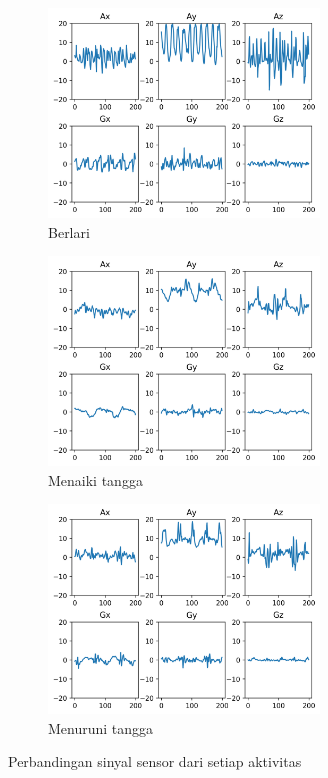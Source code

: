 \begin{figure}[h!]
\begin{subfigure}{0.5\textwidth}
        \includegraphics[width=7.2cm]{data/plot-sensor/berlari.png}
        \caption{Berlari}
        \label{gambar:plot-sensor-berlari}
    \end{subfigure}
    \begin{subfigure}{0.5\textwidth}
        \includegraphics[width=7.2cm]{data/plot-sensor/naik-tangga.png}
        \caption{Menaiki tangga}
        \label{gambar:plot-sensor-naik-tangga}
    \end{subfigure}
    \begin{subfigure}{0.5\textwidth}
        \includegraphics[width=7.2cm]{data/plot-sensor/turun-tangga.png}
        \caption{Menuruni tangga}
        \label{gambar:plot-sensor-turun-tangga}
    \end{subfigure}

    \caption{Perbandingan sinyal sensor dari setiap aktivitas}
    \label{gambar:plot-sensor}
\end{figure}

